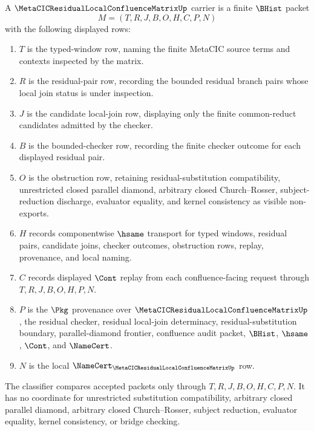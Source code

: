 \begin{definition}
\label{def:metacic-residual-local-confluence-matrix-carrier}
A $\MetaCICResidualLocalConfluenceMatrixUp$ carrier is a finite $\BHist$ packet
$$
M=(T,R,J,B,O,H,C,P,N)
$$
with the following displayed rows:
\begin{enumerate}
\item $T$ is the typed-window row, naming the finite MetaCIC source terms and contexts inspected by the matrix.
\item $R$ is the residual-pair row, recording the bounded residual branch pairs whose local join status is under inspection.
\item $J$ is the candidate local-join row, displaying only the finite common-reduct candidates admitted by the checker.
\item $B$ is the bounded-checker row, recording the finite checker outcome for each displayed residual pair.
\item $O$ is the obstruction row, retaining residual-substitution compatibility, unrestricted closed parallel diamond, arbitrary closed Church--Rosser, subject-reduction discharge, evaluator equality, and kernel consistency as visible non-exports.
\item $H$ records componentwise $\hsame$ transport for typed windows, residual pairs, candidate joins, checker outcomes, obstruction rows, replay, provenance, and local naming.
\item $C$ records displayed $\Cont$ replay from each confluence-facing request through $T,R,J,B,O,H,P,N$.
\item $P$ is the $\Pkg$ provenance over $\MetaCICResidualLocalConfluenceMatrixUp$, the residual checker, residual local-join determinacy, residual-substitution boundary, parallel-diamond frontier, confluence audit packet, $\BHist$, $\hsame$, $\Cont$, and $\NameCert$.
\item $N$ is the local $\NameCert_{\MetaCICResidualLocalConfluenceMatrixUp}$ row.
\end{enumerate}
The classifier compares accepted packets only through $T,R,J,B,O,H,C,P,N$. It has no coordinate for unrestricted substitution compatibility, arbitrary closed parallel diamond, arbitrary closed Church--Rosser, subject reduction, evaluator equality, kernel consistency, or bridge checking.
\end{definition}


